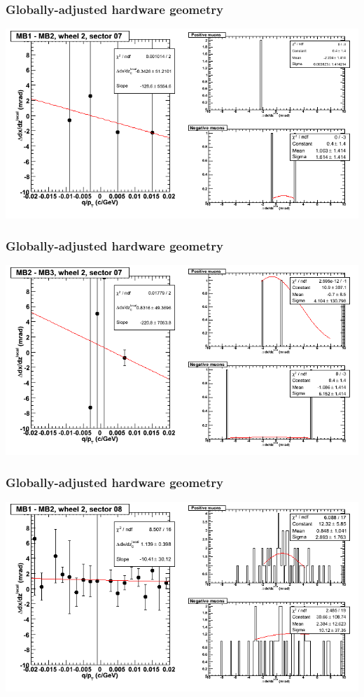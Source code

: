 \documentclass[compress]{beamer}
\begin{document}
\begin{frame}
\frametitle{Globally-adjusted hardware geometry}
\includegraphics[width=\linewidth]{NOV4_segdiffs_HW/dt13_slope_E_07_12.png}
\end{frame}

\begin{frame}
\frametitle{Globally-adjusted hardware geometry}
\includegraphics[width=\linewidth]{NOV4_segdiffs_HW/dt13_slope_E_07_23.png}
\end{frame}

\begin{frame}
\frametitle{Globally-adjusted hardware geometry}
\includegraphics[width=\linewidth]{NOV4_segdiffs_HW/dt13_slope_E_08_12.png}
\end{frame}
\end{document}
